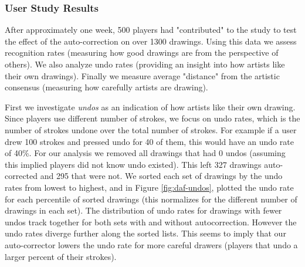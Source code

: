 

\subsubsection {User Study Results}

After approximately one week, 500 players had "contributed" to the study to test the effect of the auto-correction on over 1300 drawings. Using this data we assess recognition rates (measuring how good drawings are from the perspective of others). We also analyze undo rates (providing an insight into how artists like their own drawings). Finally we measure average "distance" from the artistic consensus (measuring how carefully artists are drawing).



First we investigate {\em undos} as an indication of how artists like their own drawing. Since players use different number
of strokes, we focus on undo rates, which is the number of strokes undone over the total number of strokes. For example if
a user drew 100 strokes and pressed undo for 40 of them, this would have an undo rate of 40\%. For our analysis we removed
all drawings that had 0 undos (assuming this implied players did not know undo existed). This left 327 drawings auto-corrected
 and 295 that were not. We sorted each set of drawings by the undo rates from lowest to highest, and in Figure
\ref{fig:daf-undos}, plotted the undo rate for each percentile of sorted drawings (this normalizes for the different
number of drawings in each set). The distribution of undo rates for drawings with fewer undos track together for both
sets with and without autocorrection. However the undo rates diverge further along the sorted lists. This seems to imply
that our auto-corrector lowers the undo rate for more careful drawers (players that undo a larger percent of their
strokes).

